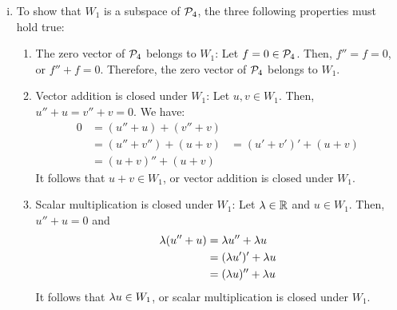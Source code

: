 \begin{sol}
    \begin{enumerate}[(i)]
        \item To show that $W_1$ is a subspace of $\P_4$, the three following properties must hold true:
              \begin{enumerate}[(1)]
                  \item The zero vector of $\P_4$ belongs to $W_1$: Let $f=0\in\P_4$. Then, $f''=f=0$, or $f''+f=0$. Therefore, the zero vector of $\P_4$ belongs to $W_1$.
                  \item Vector addition is closed under $W_1$: Let $u,v\in W_1$. Then, $u''+u=v''+v=0$. We have:
                        \[
                            \begin{aligned}
                                0 & = (u''+u)+(v''+v) \\
                                  & = (u''+v'')+(u+v)
                                  & = (u'+v')'+(u+v)  \\
                                  & = (u+v)''+(u+v)
                            \end{aligned}
                        \]
                        It follows that $u+v\in W_1$, or vector addition is closed under $W_1$.
                  \item Scalar multiplication is closed under $W_1$: Let $\lam\in\R$ and $u\in W_1$. Then, $u''+u=0$ and
                        \[
                            \begin{aligned}
                                \lam(u''+u) & = \lam u''+\lam u   \\
                                            & = (\lam u')'+\lam u \\
                                            & = (\lam u)''+\lam u
                            \end{aligned}
                        \]
                        It follows that $\lam u\in W_1$, or scalar multiplication is closed under $W_1$.


\end{enumerate}
\end{enumerate}
\end{sol}
